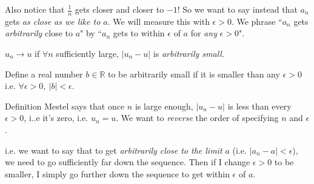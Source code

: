 \documentclass[10pt,twoside]{scrartcl}
\begin{document}
\begin{center}
\end{center}
Also notice that $\frac{1}{n}$ gets closer and closer to $-1$! So we want to say instead that $a_n$ gets \emph{as close as we like to $a$}. We will measure this with $\epsilon >0$. We phrase ``$a_n$ gets \emph{arbitrarily} close to $a$" by ``$a_n$ gets to within $\epsilon$ of $a$ for \emph{any} $\epsilon >0$".\\

\begin{definition}[Mestel]
	$u_n \to u$ if $\forall n$ sufficiently large, $|u_n - u|$ is \emph{arbitrarily small.} 
	
Define a real number $b \in \mathbb{R}$ to be arbitrarily small if it is smaller than any $\epsilon >0$ i.e. $\forall \epsilon >0,~|b| < \epsilon$.
\end{definition}

Definition Mestel says that once $n$ is large enough, $|u_n - u|$ is less than every $\epsilon >0$, i..e it's zero, i.e. $u_n = u$. We want to \emph{reverse} the order of specifying $n$ and $\epsilon$. 

i.e. we want to say that to get \emph{arbitrarily close to the limit $a$} (i.e. $|a_n - a| < \epsilon$), we need to go sufficiently far down the sequence. Then if I change $\epsilon >0$ to be smaller, I simply go further down the sequence to get within $\epsilon$ of $a$. 
\end{document}
